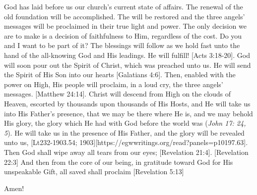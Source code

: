 God has laid before us our church’s current state of affairs. The renewal of the old foundation will be accomplished. The  will be restored and the three angels’ messages will be proclaimed in their true light and power. The only decision we are to make is a decision of faithfulness to Him, regardless of the cost. Do you and I want to be part of it? The blessings will follow as we hold fast unto the hand of the all-knowing God and His leadings.  He will fulfill! [Acts 3:18-20]. God will soon pour out the Spirit of Christ, which was preached unto us. He will send the Spirit of His Son into our hearts [Galatians 4:6].  Then, enabled with the power on High, His people will proclaim, in a loud cry, the three angels’ messages. [Matthew 24:14]. Christ will descend from High on the clouds of Heaven, escorted by thousands upon thousands of His Hosts, and He will take us into His Father’s presence, that we may be there where He is, and we may behold His glory, the glory which He had with God before the world was (\textit{John 17: 24, 5}). He will take us in the presence of His Father, and the glory will be revealed unto us, [Lt232-1903.54; 1903][https://egwwritings.org/read?panels=p10197.63]. Then God shall wipe away all tears from our eyes; [Revelation 21:4]. [Revelation 22:3] And then from the core of our being, in gratitude toward God for His unspeakable Gift, all saved  shall proclaim [Revelation 5:13]

Amen!

